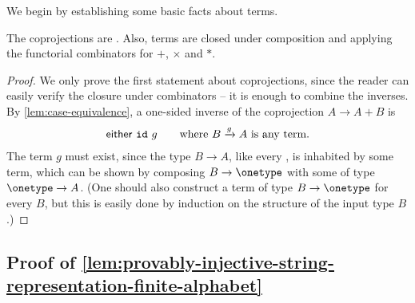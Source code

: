     We begin by establishing some basic facts about  terms. 
    \begin{claim}\label{claim:injective-terms-basic-facts}
        The coprojections are . Also,  terms are closed under composition and applying the functorial combinators for $+$, $\times$ and $*$. 
    \end{claim}
    \begin{proof}
        We only prove the first statement about coprojections, since the reader can easily verify the closure under combinators -- it is enough to combine the inverses. By \cref{lem:case-equivalence}, a one-sided inverse of the coprojection $A \to A+B$ is   
        \begin{align*}
        \mathsf{either}\ \mathtt{id}\ g \qquad \text{where $B \xrightarrow g A$ is any term}.
        \end{align*}
        The term $g$ must exist, since the type $B \to A$, like every , is inhabited by some term, which can be shown by composing $B \to \onetype$ with some  of type $\onetype \to A$. (One should also construct a term of type $B \to \onetype$ for every $B$, but this is easily done by induction on the structure of the input type $B$.)
    \end{proof}

\subsection{Proof of \cref{lem:provably-injective-string-representation-finite-alphabet}}

